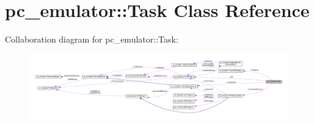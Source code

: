\hypertarget{classpc__emulator_1_1Task}{}\section{pc\+\_\+emulator\+:\+:Task Class Reference}
\label{classpc__emulator_1_1Task}


Collaboration diagram for pc\+\_\+emulator\+:\+:Task\+:\nopagebreak
\begin{figure}[H]
\begin{center}
\leavevmode
\includegraphics[width=350pt]{classpc__emulator_1_1Task__coll__graph}
\end{center}
\end{figure}
